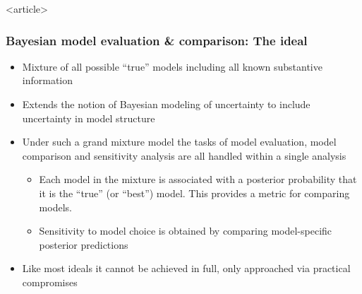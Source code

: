 \documentclass{beamer}
\begin{document}
\begin{frame}<article>
  \frametitle{Bayesian model evaluation \& comparison: The ideal}

  \begin{itemize}
  \item Mixture of all possible ``true'' models including all known
    substantive information
  \item Extends the notion of Bayesian modeling of uncertainty to
    include uncertainty in model structure
  \item Under such a grand mixture model the tasks of model
    evaluation, model comparison and sensitivity analysis are all
    handled within a single analysis
    \begin{itemize}
    \item Each model in the mixture is associated with a posterior
      probability that it is the ``true'' (or ``best'') model. This provides a metric
      for comparing models.
    \item Sensitivity to model choice is obtained by comparing
      model-specific posterior predictions
    \end{itemize}
    \item Like most ideals it cannot be achieved in full, only approached via
    practical compromises
  \end{itemize}
  
\end{frame}
\end{document}
